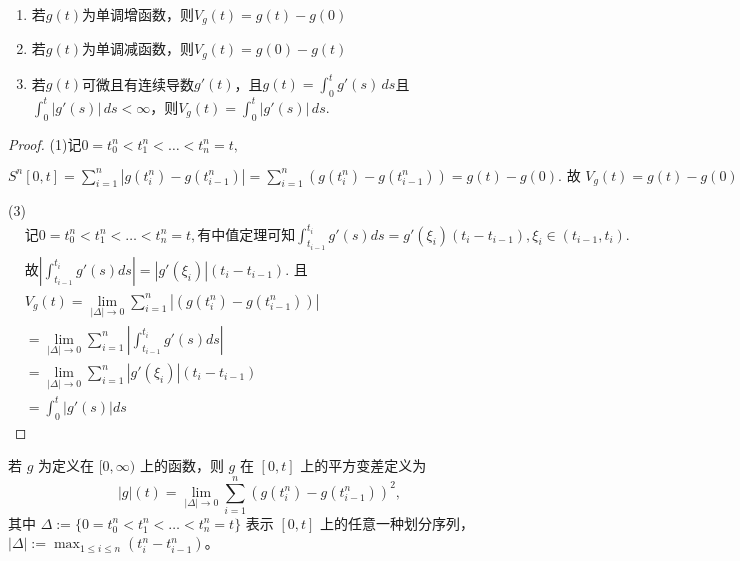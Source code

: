 \documentclass[lang=cn,10pt,thmcnt=section]{elegantbook}
\begin{document}
\begin{example}
	\begin{enumerate}
		\item 若$g(t)$为单调增函数，则$V_g(t) = g(t) - g(0)$
		\item 若$g(t)$为单调减函数，则$V_g(t) = g(0) - g(t)$
		\item 若$g(t)$可微且有连续导数$g'(t)$，且$g(t) = \int_0^t g'(s) \, ds$且$\int_0^t |g'(s)| \, ds < \infty$，则$V_g(t) = \int_0^t |g'(s)| \, ds$.
	\end{enumerate}
\end{example}
\begin{proof}
	(1)$\text{记} 0 = t_0^n < t_1^n < \ldots < t_n^n = t, $

		$S^n[0,t] = \sum_{i=1}^n |g(t_i^n) - g(t_{i-1}^n)| = \sum_{i=1}^n (g(t_i^n) - g(t_{i-1}^n)) = g(t) - g(0). \text{ 故 } V_g(t) = g(t) - g(0)$

	(3)\begin{align*}
		&\text{记} 0 = t_0^n < t_1^n < \ldots < t_n^n = t, \text{有中值定理可知} \int_{t_{i-1}}^{t_i} g'(s) ds = g'(\xi_i)(t_i - t_{i-1}), \xi_i \in (t_{i-1}, t_i). \\
		&\text{故} \left| \int_{t_{i-1}}^{t_i} g'(s) ds \right| = |g'(\xi_i)|(t_i - t_{i-1}). \text{ 且} \\
		&V_g(t) = \lim_{|\Delta| \to 0} \sum_{i=1}^n |(g(t_i^n) - g(t_{i-1}^n))| \\
		&= \lim_{|\Delta| \to 0} \sum_{i=1}^n \left| \int_{t_{i-1}}^{t_i} g'(s) ds \right| \\
		&= \lim_{|\Delta| \to 0} \sum_{i=1}^n |g'(\xi_i)|(t_i - t_{i-1}) \\
		&= \int_0^t |g'(s)| ds
		\end{align*}
\end{proof}
\begin{definition}
	若 \( g \) 为定义在 \([0, \infty)\) 上的函数，则 \( g \) 在 \([0, t]\) 上的平方变差定义为
\[
|g|(t) = \lim_{|\Delta|\to 0} \sum_{i=1}^n (g(t_i^n) - g(t_{i-1}^n))^2,
\]
其中 \(\Delta := \{0 = t_0^n < t_1^n < \ldots < t_n^n = t\}\) 表示 \([0, t]\) 上的任意一种划分序列，\(|\Delta| := \max_{1 \leq i \leq n} (t_i^n - t_{i-1}^n)\)。
\end{definition}
\end{document}
